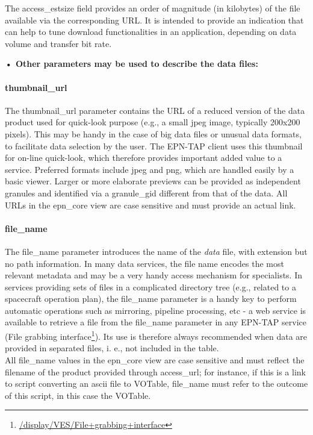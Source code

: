 \documentclass[11pt,a4paper]{ivoa}
\begin{document}
The access\_estsize field provides an order of magnitude (in kilobytes) of the file available via the corresponding URL. It is intended to provide an indication that can help to tune download functionalities in an application, depending on data volume and transfer bit rate.

\textbf{• Other parameters may be used to describe the data files:}

\paragraph{thumbnail\_url}

The thumbnail\_url parameter contains the URL of a reduced version of the data product used for quick-look purpose (e.g., a small jpeg image, typically 200x200 pixels). This may be handy in the case of big data files or unusual data formats, to facilitate data selection by the user. The EPN-TAP client uses this thumbnail for on-line quick-look, which therefore provides important added value to a service. Preferred formats include jpeg and png, which are handled easily by a basic viewer. Larger or more elaborate previews can be provided as independent granules and identified via a granule\_gid different from that of the data. All URLs in the epn\_core view are case sensitive and must provide an actual link.

\paragraph{file\_name}

The file\_name parameter introduces the name of the \emph{data} file, with extension but no path information. In many data services, the file name encodes the most relevant metadata and may be a very handy access mechanism for specialists. In services providing sets of files in a complicated directory tree (e.g., related to a spacecraft operation plan), the file\_name parameter is a handy key to perform automatic operations such as mirroring, pipeline processing, etc - a web service is available to retrieve a file from the file\_name parameter in any EPN-TAP service (File grabbing interface\footnote{\url{/display/VES/File+grabbing+interface}}). Its use is therefore always recommended when data are provided in separated files, i. e., not included in the table.\\All file\_name values in the epn\_core view are case sensitive and must reflect the filename of the product provided through access\_url; for instance, if this is a link to script converting an ascii file to VOTable, file\_name must refer to the outcome of this script, in this case the VOTable.
\end{document}
